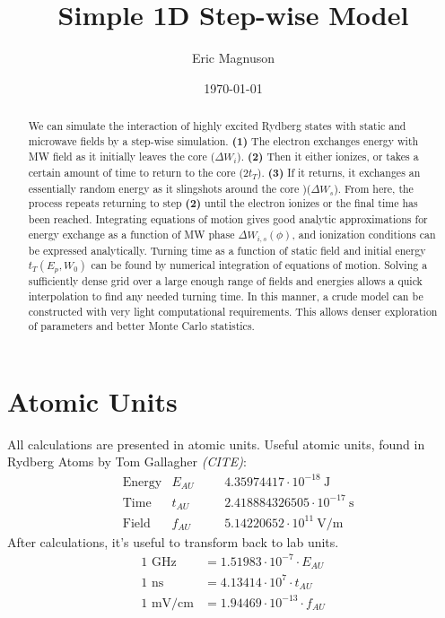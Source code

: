 \documentclass[aps,pra,preprint,groupedaddress]{revtex4-1}
\begin{document}
\title{Simple 1D Step-wise Model}

\author{Eric Magnuson}
\date{\today}

\begin{abstract}
We can simulate the interaction of highly excited Rydberg states with static and microwave fields by a step-wise simulation. \textbf{(1)} The electron exchanges energy with MW field as it initially leaves the core ($\Delta W_i$). \textbf{(2)} Then it either ionizes, or takes a certain amount of time to return to the core ($2t_T$). \textbf{(3)} If it returns, it exchanges an essentially random energy as it slingshots around the core )($\Delta W_s$). From here, the process repeats returning to step \textbf{(2)} until the electron ionizes or the final time has been reached. Integrating equations of motion gives good analytic approximations for energy exchange as a function of MW phase $\Delta W_{i,s}(\phi)$, and ionization conditions can be expressed analytically. Turning time as a function of static field and initial energy $t_T (E_p, W_0)$ can be found by numerical integration of equations of motion. Solving a sufficiently dense grid over a large enough range of fields and energies allows a quick interpolation to find any needed turning time. In this manner, a crude model can be constructed with very light computational requirements. This allows denser exploration of parameters and better Monte Carlo statistics.
\end{abstract}

\maketitle

\section{\label{sec:AU}Atomic Units}

All calculations are presented in atomic units. Useful atomic units, found in Rydberg Atoms by Tom Gallagher \emph{(CITE)}:
\begin{align*}
 & \text{Energy} & E_{AU} & & & 4.35974417 \cdot 10^{-18} ~ \text{J} \\
 & \text{Time} & t_{AU} & & & 2.418884326505 \cdot 10^{-17} ~ \text{s} \\
 & \text{Field} & f_{AU} & & & 5.14220652 \cdot 10^{11} ~ \text{V/m}
\end{align*}
After calculations, it's useful to transform back to lab units.
\begin{align*}
\text{1 GHz} & = 1.51983 \cdot 10^{-7} \cdot E_{AU} \\
\text{1 ns} & = 4.13414 \cdot 10^7 \cdot t_{AU} \\
\text{1 mV/cm} & = 1.94469 \cdot 10^{-13} \cdot f_{AU}
\end{align*}
\end{document}

